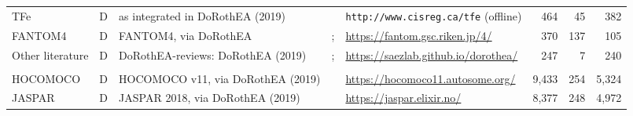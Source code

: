 \begin{table}[htbp]
\begin{tabular}{@{}llp{2.8cm}p{2.3cm}p{3.1cm}rrr@{}}
TFe & D & \parbox[t]{2.8cm}{\raggedright\scriptsize as integrated in DoRothEA (2019)} & \parbox[t]{2.3cm}{\raggedright\scriptsize \citet{yusuf2012tfe}} & \parbox[t]{3.1cm}{\raggedright\scriptsize \nolinkurl{http://www.cisreg.ca/tfe} (offline)} & 464 & 45 & 382 \\
FANTOM4 & D & \parbox[t]{2.8cm}{\raggedright\scriptsize FANTOM4, via DoRothEA} & \parbox[t]{2.3cm}{\raggedright\scriptsize \citet{fantom2009transcriptional}; \citet{kawaji2011fantom}} & \parbox[t]{3.1cm}{\raggedright\scriptsize \url{https://fantom.gsc.riken.jp/4/}} & 370 & 137 & 105 \\
Other literature & D & \parbox[t]{2.8cm}{\raggedright\scriptsize DoRothEA-reviews: DoRothEA (2019)} & \parbox[t]{2.3cm}{\raggedright\scriptsize \citet{garcia2019benchmark}; \citet{gronostajski2011nfi}} & \parbox[t]{3.1cm}{\raggedright\scriptsize \url{https://saezlab.github.io/dorothea/}} & 247 & 7 & 240 \\
\addlinespace[3pt]
 \\
HOCOMOCO & D & \parbox[t]{2.8cm}{\raggedright\scriptsize HOCOMOCO v11, via DoRothEA (2019)} & \parbox[t]{2.3cm}{\raggedright\scriptsize \citet{kulakovskiy2018hocomoco}} & \parbox[t]{3.1cm}{\raggedright\scriptsize \url{https://hocomoco11.autosome.org/}} & 9{,}433 & 254 & 5{,}324 \\
JASPAR & D & \parbox[t]{2.8cm}{\raggedright\scriptsize JASPAR 2018, via DoRothEA (2019)} & \parbox[t]{2.3cm}{\raggedright\scriptsize \citet{khan2018jaspar}} & \parbox[t]{3.1cm}{\raggedright\scriptsize \url{https://jaspar.elixir.no/}} & 8{,}377 & 248 & 4{,}972 \\
\bottomrule
\end{tabular}
\end{table}


